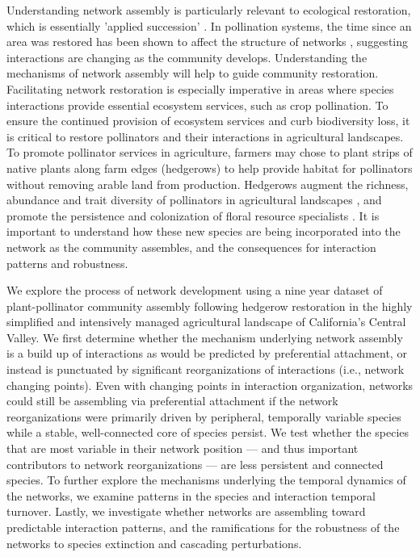 \documentclass[12pt]{article}
\begin{document}
Understanding network assembly is particularly relevant to ecological
restoration, which is essentially 'applied succession'
\citep[e.g.,][]{parker1997scale}. In pollination systems, the time
since an area was restored has been shown to affect the structure of
networks \citep{forup-2008-742, devoto2012understanding}, suggesting
interactions are changing as the community develops. Understanding the
mechanisms of network assembly will help to guide community
restoration. Facilitating network restoration is especially imperative
in areas where species interactions provide essential ecosystem
services, such as crop pollination. To ensure the continued provision
of ecosystem services and curb biodiversity loss, it is critical to
restore pollinators and their interactions in agricultural
landscapes. To promote pollinator services in agriculture, farmers may
chose to plant strips of native plants along farm edges (hedgerows) to
help provide habitat for pollinators without removing arable land from
production. Hedgerows augment the richness, abundance and trait
diversity of pollinators in agricultural landscapes
\citep{morandin-2013-829, kremen-2015-602, ponisio2015farm}, and
promote the persistence and colonization of floral resource
specialists \citep{mgonigle-2015-x}. It is important to understand how
these new species are being incorporated into the network as the
community assembles, and the consequences for interaction patterns and
robustness.

We explore the process of network development using a nine year
dataset of plant-pollinator community assembly following hedgerow
restoration in the highly simplified and intensively managed
agricultural landscape of California's Central Valley.  We first
determine whether the mechanism underlying network assembly is a build
up of interactions as would be predicted by preferential attachment,
or instead is punctuated by significant reorganizations of
interactions (i.e., network changing points). Even with changing
points in interaction organization, networks could still be assembling
via preferential attachment if the network reorganizations were
primarily driven by peripheral, temporally variable species while a
stable, well-connected core of species persist. We test whether the
species that are most variable in their network position --- and thus
important contributors to network reorganizations --- are less
persistent and connected species. To further explore the mechanisms
underlying the temporal dynamics of the networks, we examine patterns
in the species and interaction temporal turnover. Lastly, we
investigate whether networks are assembling toward predictable
interaction patterns, and the ramifications for the robustness of the
networks to species extinction and cascading perturbations.
\end{document}
